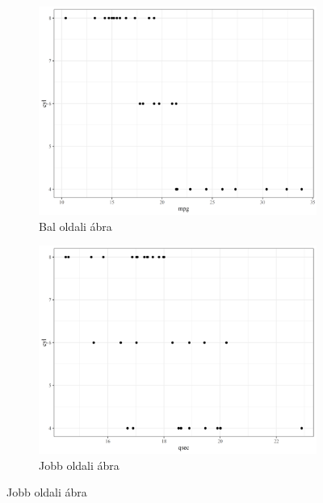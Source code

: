 \documentclass[
]{article}
\begin{document}
\begin{figure}[h]
\begin{multicols}{2}
\begin{figure}[H]
\includegraphics[width = \linewidth]{cookbook_files/figure-latex/cyl-fig1-1}
\caption{Bal oldali ábra}
\label{fig:bar2_a2}
\end{figure}

\columnbreak

\begin{figure}[H]
\includegraphics[width = \linewidth]{cookbook_files/figure-latex/cyl-fig1-2}
\centering
\caption{Jobb oldali ábra}
\label{fig:bar2_b2}
\end{figure}
\end{multicols}
\end{figure}
\end{document}
